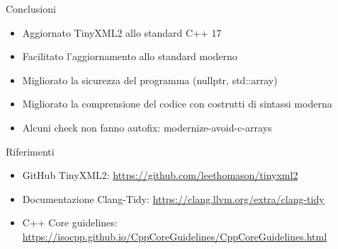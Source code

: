 \documentclass[aspectratio=169]{beamer}
\begin{document}

\begin{frame}{Conclusioni}
  \begin{itemize}
    \item Aggiornato TinyXML2 allo standard C++ 17
    \item Facilitato l'aggiornamento allo standard moderno
    \item Migliorato la sicurezza del programma (nullptr, std::array)
    \item Migliorato la comprensione del codice con costrutti di sintassi moderna
    \item Alcuni check non fanno autofix: {modernize-avoid-c-arrays}
     \end{itemize}
\end{frame}



\begin{frame}{Riferimenti}
  \begin {itemize}
\item GitHub TinyXML2: \url{https://github.com/leethomason/tinyxml2}
\item Documentazione Clang-Tidy: \url{https://clang.llvm.org/extra/clang-tidy}
\item C++ Core guidelines: \url{https://isocpp.github.io/CppCoreGuidelines/CppCoreGuidelines.html}
  \end {itemize}
\end{frame}

\end{document}

